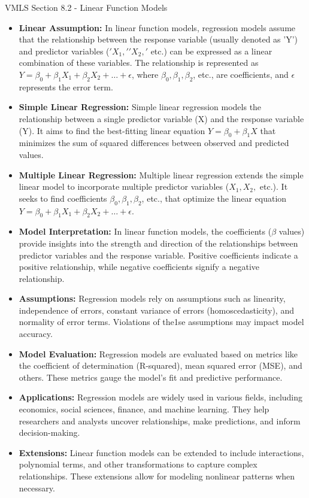 \begin{notes}{VMLS Section 8.2 - Linear Function Models}
    \begin{itemize}
        \item \textbf{Linear Assumption:} In linear function models, regression models assume that the relationship between the response variable (usually denoted as 'Y') and predictor variables 
        ($'X_{1},' 'X_{2},'$ etc.) can be expressed as a linear combination of these variables. The relationship is represented as $Y = \beta_{0} + \beta_{1}X_{1} + \beta_{2}X_{2} + \dots + \epsilon$, 
        where $\beta_{0}, \beta_{1}, \beta_{2}$, etc., are coefficients, and $\epsilon$ represents the error term.
        \item \textbf{Simple Linear Regression:} Simple linear regression models the relationship between a single predictor variable (X) and the response variable (Y). It aims to find the best-fitting 
        linear equation $Y = \beta_{0} + \beta_{1}X$ that minimizes the sum of squared differences between observed and predicted values.
        \item \textbf{Multiple Linear Regression:} Multiple linear regression extends the simple linear model to incorporate multiple predictor variables ($X_{1}, X_{2},$ etc.). It seeks to find coefficients 
        $\beta_{0}, \beta_{1}, \beta_{2}$, etc., that optimize the linear equation $Y = \beta_{0} + \beta_{1}X_{1} + \beta_{2}X_{2} + \dots + \epsilon$.
        \item \textbf{Model Interpretation:} In linear function models, the coefficients ($\beta$ values) provide insights into the strength and direction of the relationships between predictor variables 
        and the response variable. Positive coefficients indicate a positive relationship, while negative coefficients signify a negative relationship.
        \item \textbf{Assumptions:} Regression models rely on assumptions such as linearity, independence of errors, constant variance of errors (homoscedasticity), and normality of error terms. Violations 
        of the1se assumptions may impact model accuracy.
        \item \textbf{Model Evaluation:} Regression models are evaluated based on metrics like the coefficient of determination (R-squared), mean squared error (MSE), and others. These metrics gauge the 
        model's fit and predictive performance.
        \item \textbf{Applications:} Regression models are widely used in various fields, including economics, social sciences, finance, and machine learning. They help researchers and analysts uncover 
        relationships, make predictions, and inform decision-making.
        \item \textbf{Extensions:} Linear function models can be extended to include interactions, polynomial terms, and other transformations to capture complex relationships. These extensions allow for 
        modeling nonlinear patterns when necessary.
    \end{itemize}
    

\end{notes}
